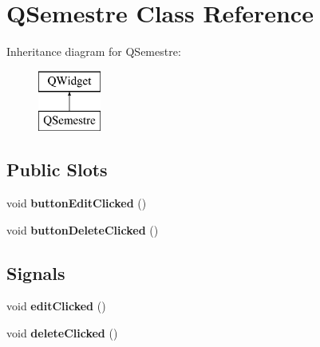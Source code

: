 \hypertarget{classQSemestre}{\section{Q\+Semestre Class Reference}
\label{classQSemestre}
}
Inheritance diagram for Q\+Semestre\+:\begin{figure}[H]
\begin{center}
\leavevmode
\includegraphics[height=2.000000cm]{classQSemestre}
\end{center}
\end{figure}
\subsection*{Public Slots}
\begin{DoxyCompactItemize}
\item 
\hypertarget{classQSemestre_ac09eff6f409966a2b4bb8b4a6a2d5507}{void {\bfseries button\+Edit\+Clicked} ()}\label{classQSemestre_ac09eff6f409966a2b4bb8b4a6a2d5507}

\item 
\hypertarget{classQSemestre_a864686d70b98929ddbc5d1c8390c1bdb}{void {\bfseries button\+Delete\+Clicked} ()}\label{classQSemestre_a864686d70b98929ddbc5d1c8390c1bdb}

\end{DoxyCompactItemize}
\subsection*{Signals}
\begin{DoxyCompactItemize}
\item 
\hypertarget{classQSemestre_a7ec51eca19ce97c665c2b288a756f3a0}{void {\bfseries edit\+Clicked} ()}\label{classQSemestre_a7ec51eca19ce97c665c2b288a756f3a0}

\item 
\hypertarget{classQSemestre_af32fd11f9440770dec1ac5deb7d62e10}{void {\bfseries delete\+Clicked} ()}\label{classQSemestre_af32fd11f9440770dec1ac5deb7d62e10}

\end{DoxyCompactItemize}
